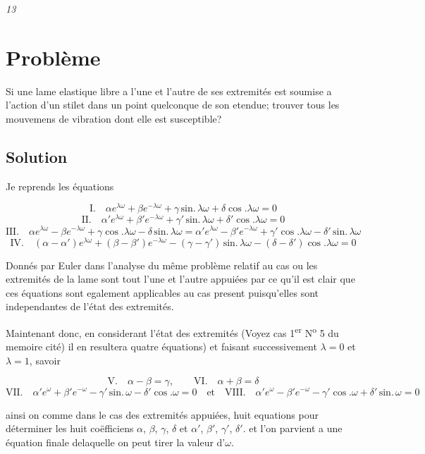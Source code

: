 \documentclass[11pt,a4paper]{article}
\begin{document}
\emph{13}

\section{Problème}

Si une lame elastique  libre a l'une et l'autre de ses extremités
est soumise a l'action d'un stilet dans un point quelconque de son etendue;
trouver tous les mouvemens de vibration dont elle est susceptible?

\subsection{Solution}

Je reprends les équations

\[ \text{I.}\quad \alpha e^{\lambda\omega}+\beta e^{-\lambda\omega}+\gamma\,\text{sin.}\,\lambda\omega+\delta\cos.\lambda\omega=0 \]
\[ \text{II.}\quad \alpha' e^{\lambda\omega}+\beta' e^{-\lambda\omega}+\gamma'\,\text{sin.}\,\lambda\omega+\delta'\cos.\lambda\omega=0 \]
\[ \text{III.}\quad \alpha e^{\lambda\omega}-\beta e^{-\lambda\omega}+\gamma\cos.\lambda\omega-\delta\,\text{sin.}\,\lambda\omega=\alpha' e^{\lambda\omega}-\beta' e^{-\lambda\omega}+\gamma'\cos.\lambda\omega-\delta'\,\text{sin.}\,\lambda\omega \]
\[ \text{IV.}\quad (\alpha-\alpha')e^{\lambda\omega}+(\beta-\beta')e^{-\lambda\omega}-(\gamma-\gamma')\,\text{sin.}\,\lambda\omega-(\delta-\delta')\cos.\lambda\omega=0 \]

Donnés par Euler dans l'analyse du même problème relatif au cas ou les
extremités de la lame sont tout l'une et l'autre appuiées par ce qu'il est
clair que ces équations sont egalement applicables au cas present puisqu'elles
sont independantes de l'état des extremités.

Maintenant donc, en considerant l'état des extremités (Voyez cas 1\textsuperscript{er}
N\textsuperscript{o} 5 du memoire cité) il en resultera quatre équations) et
faisant successivement $\lambda=0$ et $\lambda=1$, savoir

\[ \text{V.}\quad \alpha-\beta=\gamma, \qquad \text{VI.}\quad \alpha+\beta=\delta \]
\[ \text{VII.}\quad \alpha' e^{\omega}+\beta' e^{-\omega}-\gamma'\,\text{sin.}\,\omega-\delta'\cos.\omega=0 \quad\text{et}\quad \text{VIII.}\quad \alpha' e^{\omega}-\beta' e^{-\omega}-\gamma'\cos.\omega+\delta'\,\text{sin.}\,\omega=0 \]

ainsi on \struck{\ill{}} comme dans le cas des extremités appuiées, huit
equations pour déterminer les huit coëfficiens $\alpha$, $\beta$, $\gamma$,
$\delta$ et $\alpha'$, $\beta'$, $\gamma'$, $\delta'$. et l'on parvient
 a une équation finale delaquelle on peut tirer la valeur
d'$\omega$.
\end{document}
